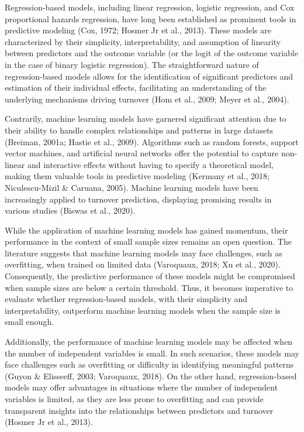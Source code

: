 \documentclass[
  man]{apa7}
\begin{document}
Regression-based models, including linear regression, logistic regression, and Cox proportional hazards regression, have long been established as prominent tools in predictive modeling (Cox, 1972; Hosmer Jr et al., 2013).
These models are characterized by their simplicity, interpretability, and assumption of linearity between predictors and the outcome variable (or the logit of the outcome variable in the case of binary logistic regression).
The straightforward nature of regression-based models allows for the identification of significant predictors and estimation of their individual effects, facilitating an understanding of the underlying mechanisms driving turnover (Hom et al., 2009; Meyer et al., 2004).

Contrarily, machine learning models have garnered significant attention due to their ability to handle complex relationships and patterns in large datasets (Breiman, 2001a; Hastie et al., 2009).
Algorithms such as random forests, support vector machines, and artificial neural networks offer the potential to capture non-linear and interactive effects without having to specify a theoretical model, making them valuable tools in predictive modeling (Kermany et al., 2018; Niculescu-Mizil \& Caruana, 2005).
Machine learning models have been increasingly applied to turnover prediction, displaying promising results in various studies (Biswas et al., 2020).

While the application of machine learning models has gained momentum, their performance in the context of small sample sizes remains an open question.
The literature suggests that machine learning models may face challenges, such as overfitting, when trained on limited data (Varoquaux, 2018; Xu et al., 2020).
Consequently, the predictive performance of these models might be compromised when sample sizes are below a certain threshold.
Thus, it becomes imperative to evaluate whether regression-based models, with their simplicity and interpretability, outperform machine learning models when the sample size is small enough.

Additionally, the performance of machine learning models may be affected when the number of independent variables is small.
In such scenarios, these models may face challenges such as overfitting or difficulty in identifying meaningful patterns (Guyon \& Elisseeff, 2003; Varoquaux, 2018).
On the other hand, regression-based models may offer advantages in situations where the number of independent variables is limited, as they are less prone to overfitting and can provide transparent insights into the relationships between predictors and turnover (Hosmer Jr et al., 2013).
\end{document}
